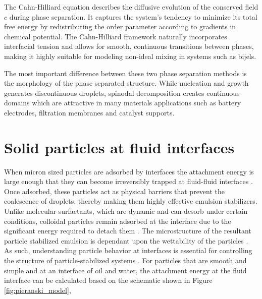 The Cahn-Hilliard equation describes the diffusive evolution of the conserved field $c$ during phase separation. It captures the system's tendency to minimize its total free energy 
by redistributing the order parameter according to gradients in chemical potential. The Cahn-Hilliard framework naturally incorporates interfacial tension and allows for smooth, 
continuous transitions between phases, making it highly suitable for modeling non-ideal mixing in systems such as bijels.

The most important difference between these two phase separation methods is the morphology of the phase separated structure. While nucleation and growth generates discontinuous droplets,
spinodal decomposition creates continuous domains which are attractive in many materials applications such as battery electrodes, filtration membranes and catalyst supports.

\section{Solid particles at fluid interfaces}

When micron sized particles are adsorbed by interfaces the attachment energy is large enough that they can become irreversibly trapped at fluid-fluid interfaces 
\cite{ngai_particle-stabilized_2015}. Once adsorbed, these particles act as physical barriers that prevent the coalescence of droplets, thereby making them highly effective 
emulsion stabilizers. Unlike molecular surfactants, which are dynamic and can desorb under certain conditions, colloidal particles remain adsorbed at the interface due to the 
significant energy required to detach them \cite{ngai_particle-stabilized_2015}. The microstructure of the resultant particle stabilized emulsion is dependant upon the wettability 
of the particles \cite{ngai_particle-stabilized_2015,velankar_non-equilibrium_2015}.
As such, understanding particle behavior at interfaces is essential for controlling the structure of particle-stabilized systems \cite{ngai_particle-stabilized_2015}. 
For particles that are smooth and simple and at an interface of oil and water, the attachment energy at the fluid interface can be calculated based on the schematic shown in 
Figure \ref{fig:pieranski_model},

